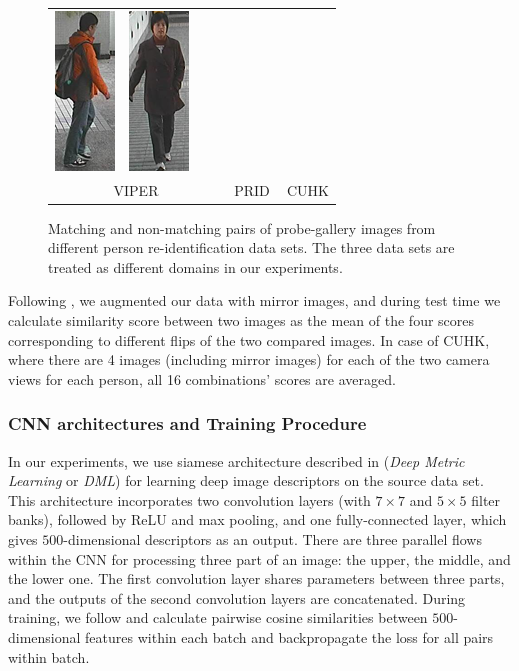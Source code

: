 \begin{figure}
\begin{tabular}{cccc|cccc|cccc}
\includegraphics[height=\reidheight]{Chapters/gradrev/figures/dataset_samples/cuhk/a/002_00280.png}&
\includegraphics[height=\reidheight]{Chapters/gradrev/figures/dataset_samples/cuhk/b/003_00403.png}\\
\multicolumn{4}{c}{VIPER}&
\multicolumn{4}{c}{PRID}&
\multicolumn{4}{c}{CUHK}
\end{tabular}
\caption{Matching and non-matching pairs of probe-gallery images from different person re-identification data sets. The three data sets are treated as different domains in our experiments.}
\label{fig:reidsamples}
\end{figure}

\addtolength{\tabcolsep}{3pt}

Following \citet{YiLL14}, we augmented our data with mirror images, and during test time we calculate similarity score between two images as the mean of the four scores corresponding to different flips of the two compared images. In case of CUHK, where there are 4 images (including mirror images) for each of the two camera views for each person, all 16 combinations' scores are averaged. 

\subsubsection{CNN architectures and Training Procedure} 

In our experiments, we use siamese architecture described in \citet{YiLL14} (\textit{Deep Metric Learning} or \textit{DML}) for learning deep image descriptors on the source data set.
This architecture incorporates two convolution layers (with $7\times7$ and $5\times5$ filter banks), followed by ReLU and max pooling, and one fully-connected layer, which gives $500$-dimensional descriptors as an output. There are three parallel flows within the CNN for processing three part of an image: the upper, the middle, and the lower one. The first convolution layer shares parameters between three parts, and the outputs of the second convolution layers are concatenated.
During training, we follow \citet{YiLL14} and calculate pairwise cosine similarities between $500$-dimensional features within each batch and backpropagate the loss for all pairs within batch. 

